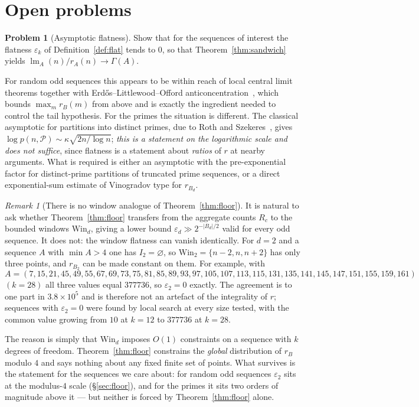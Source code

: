 \documentclass[11pt,a4paper]{article}
\theoremstyle{plain}
\theoremstyle{definition}
\newtheorem{problem}[theorem]{Problem}
\theoremstyle{remark}
\newtheorem{remark}[theorem]{Remark}
\DeclareMathOperator{\lm}{lm}
\begin{document}
\section{Open problems}\label{sec:open}

\begin{problem}[Asymptotic flatness]\label{prob:flatness}
Show that for the sequences of interest the flatness $\varepsilon_k$ of
Definition~\ref{def:flat} tends to $0$, so that
Theorem~\ref{thm:sandwich} yields $\lm_A(n)/r_A(n)\to\Gamma(A)$.
\end{problem}

For random odd sequences this appears to be within reach of local central limit
theorems together with Erd\H{o}s--Littlewood--Offord
anticoncentration~\cite{Er45}, which bounds $\max_m r_B(m)$ from above and is
exactly the ingredient needed to control the tail hypothesis. For the primes the
situation is different. The classical asymptotic for partitions into distinct
primes, due to Roth and Szekeres~\cite{RS54}, gives
$\log p(n,\mathcal{P})\sim\kappa\sqrt{2n/\log n}$; \emph{this is a statement on
the logarithmic scale and does not suffice}, since flatness is a statement about
\emph{ratios} of $r$ at nearby arguments. What is required is either an
asymptotic with the pre-exponential factor for distinct-prime partitions of
truncated prime sequences, or a direct exponential-sum estimate of Vinogradov
type for $r_{B_d}$.

\begin{remark}[There is no window analogue of Theorem~\ref{thm:floor}]
\label{rem:no-window-floor}
It is natural to ask whether Theorem~\ref{thm:floor} transfers from the
aggregate counts $R_c$ to the bounded windows $\mathrm{Win}_d$, giving a lower
bound $\varepsilon_d\gg2^{-|B_d|/2}$ valid for every odd sequence. It does not:
the window flatness can vanish identically. For $d=2$ and a sequence $A$ with
$\min A>4$ one has $I_2=\varnothing$, so $\mathrm{Win}_2=\{n-2,n,n+2\}$ has only
three points, and $r_{B_2}$ can be made constant on them. For example, with
\[
  A=(7,15,21,45,49,55,67,69,73,75,81,85,89,93,97,105,107,113,115,131,135,141,145,147,151,155,159,161)
\]
$(k=28)$ all three values equal $377736$, so $\varepsilon_2=0$ exactly. The
agreement is to one part in $3.8\times10^{5}$ and is therefore not an artefact
of the integrality of $r$; sequences with $\varepsilon_2=0$ were found by local
search at every size tested, with the common value growing from $10$ at $k=12$
to $377736$ at $k=28$.

The reason is simply that $\mathrm{Win}_d$ imposes $O(1)$ constraints on a
sequence with $k$ degrees of freedom. Theorem~\ref{thm:floor} constrains the
\emph{global} distribution of $r_B$ modulo $4$ and says nothing about any fixed
finite set of points. What survives is the statement for the sequences we care
about: for random odd sequences $\varepsilon_2$ sits at the modulus-$4$ scale
(\S\ref{sec:floor}), and for the primes it sits two orders of magnitude above
it --- but neither is forced by Theorem~\ref{thm:floor} alone.
\end{remark}
\end{document}
